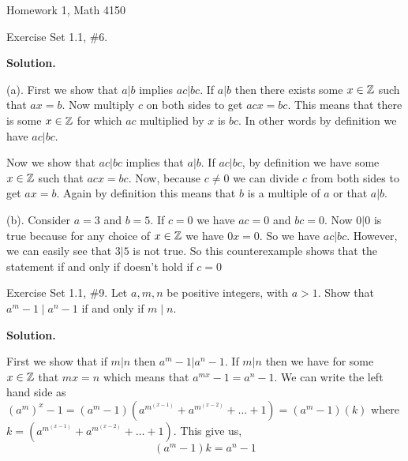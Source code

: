\documentclass[12pt]{exam}
\begin{document}
 

 \begin{center}
 {\Large Homework 1, Math 4150 }
 \\
 \end{center}


\begin{questions}
\question  Exercise Set 1.1, \#6. 

\textbf{Solution.}

(a).
    First we show that $a | b$ implies  $ac | bc$. If $a | b$ then  there exists some $x \in \mathbb{Z}$ such that  $ax = b$. Now multiply $c$ on both sides to get $acx = bc$. This means that there is some $x \in \mathbb{Z}$ for which  $ac$ multiplied by  $x$ is $bc$. In other words by definition we have  $ac | bc$.


    Now we show that $ac | bc$ implies that  $a | b$. If  $ac | bc$, by definition we have  some $x \in \mathbb{Z}$ such that  $ac x = bc$. Now, because  $c \ne 0$ we can divide  $c$ from both sides to get  $ ax = b$. Again by definition this means that  $b$ is a multiple of  $a$ or that $a | b$.


(b). Consider $a = 3$ and  $b = 5$. If  $c = 0$ we have  $ac = 0 $ and  $bc = 0$. Now  $0 | 0$ is true because for any choice of  $x \in \mathbb{Z}$ we have  $0x = 0$. So we have  $ac | bc$. However, we can easily see that  $3 | 5$ is not true. So this counterexample shows that the statement if and only if doesn't hold if  $c = 0$





\newpage 
\question  Exercise Set 1.1, \#9.  
Let $a, m,n$ be positive integers, with $a>1$. Show that $a ^{m}-1 \mid a ^{n}-1$ if and only if $m\mid n$. 

\textbf{Solution.}

First we show that if $m | n$ then  $a^{m} - 1 | a^{n} - 1$. If $m | n$ then we have for some  $x \in \mathbb{Z}$ that  $mx = n$ which means that  $a^{mx} - 1 = a^{n} - 1$. We can write the left hand side as $(a^{m})^{x} - 1 = (a^{m} - 1)(a^{m}^{(x - 1)}+a^{m}^{(x - 2)}+ \dots+ 1) = (a^{m} - 1)(k)$ where $k = (a^{m}^{(x - 1)}+a^{m}^{(x - 2)}+ \dots+ 1)$. This give us, 
$$ (a^{m} - 1) k = a^{n} - 1 $$ 


\end{questions}
\end{document}
